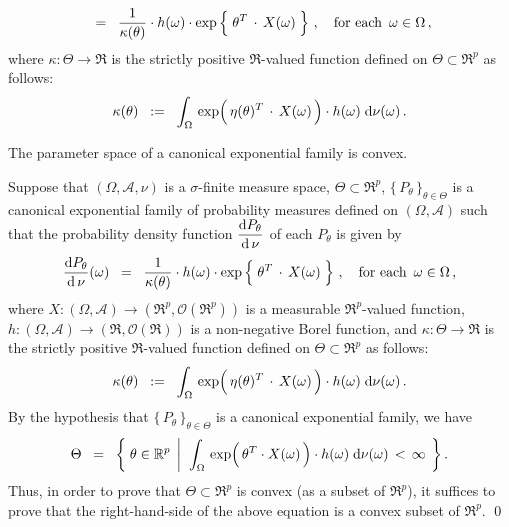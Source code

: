 \begin{definition}
\begin{enumerate}
\begin{equation*}
	\;\; = \;\;
		\dfrac{1}{\kappa(\theta)}
		\cdot
		h(\omega)
		\cdot
		\exp\left\{\; \theta^{T} \overset{{\color{white}-}}{\cdot} X(\omega) \;\right\}
		\,,
		\quad
		\textnormal{for each \,$\omega\in\Omega$}\,,
	\end{equation*}
	where $\kappa : \Theta \longrightarrow \Re$ is the strictly positive
	$\Re$-valued function defined on $\Theta \subset \Re^{p}$ as follows:
	\begin{equation*}
	\kappa(\theta)
	\;\; := \;\;
		\int_{\Omega}\,
			\exp\!\left(\,\eta(\theta)^{T} \overset{{\color{white}-}}{\cdot} X(\omega)\,\right) \cdot h(\omega)
		\;\d\nu(\omega)\,.
	\end{equation*}
\end{enumerate}
\end{definition}


\begin{theorem}\quad
The parameter space of a canonical exponential family is convex.
\end{theorem}
\proof
Suppose that $(\Omega,\mathcal{A},\nu)$ is a $\sigma$-finite measure space,
$\Theta \subset \Re^{p}$, $\{\,P_{\theta}\,\}_{\theta\in\Theta}$ is a canonical exponential family 
of probability measures defined on $(\Omega,\mathcal{A})$ such that the probability
density function $\dfrac{\textnormal{d} P_{\theta}}{\textnormal{d}\,\nu}$ of each $P_{\theta}$ is given by
\begin{equation*}
	\dfrac{\d P_{\theta}}{\d\,\nu}(\omega)
	\;\; = \;\;
		\dfrac{1}{\kappa(\theta)}
		\cdot
		h(\omega)
		\cdot
		\exp\left\{\; \theta^{T} \overset{{\color{white}-}}{\cdot} X(\omega) \;\right\}
		\,,
		\quad
		\textnormal{for each \,$\omega\in\Omega$}\,,
\end{equation*}
where
$X : (\Omega,\mathcal{A}) \longrightarrow (\Re^{p},\mathcal{O}(\Re^{p}))$
is a measurable $\Re^{p}$-valued function,
$h : (\Omega,\mathcal{A}) \longrightarrow (\Re,\mathcal{O}(\Re))$
is a non-negative Borel function, and
$\kappa : \Theta \longrightarrow \Re$ is the strictly positive
$\Re$-valued function defined on $\Theta \subset \Re^{p}$ as follows:
\begin{equation*}
\kappa(\theta)
\;\; := \;\;
	\int_{\Omega}\,
		\exp\!\left(\,\eta(\theta)^{T} \overset{{\color{white}-}}{\cdot} X(\omega)\,\right) \cdot h(\omega)
	\;\d\nu(\omega)\,.
\end{equation*}
By the hypothesis that $\{\,P_{\theta}\,\}_{\theta\in\Theta}$ is a canonical exponential family, we have
\begin{equation*}
\Theta
\;\; = \;\;
	\left\{\;
		\theta \in \Re^{p}
		\;\left\vert\;\;
		\int_{\Omega}\,
			\exp\!\left(\,\theta^{T} \!\overset{{\color{white}-}}{\cdot}\! X(\omega)\,\right) \cdot h(\omega)
		\;\d\nu(\omega)
		\, < \, \infty
		\right.
	\;\right\}.
\end{equation*}
Thus, in order to prove that $\Theta \subset \Re^{p}$ is convex (as a subset of $\Re^{p}$),
it suffices to prove that the right-hand-side of the above equation is a convex subset of $\Re^{p}$.
\qed

